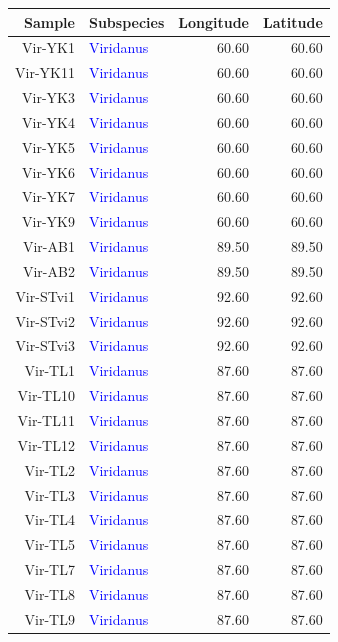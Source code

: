\documentclass[12pt]{article}
\begin{document}
\begin{table}
\centering
\tiny
\begin{tabular}{rlrr}
  \hline
Sample & Subspecies & Longitude & Latitude \\ 
  \hline
 Vir-YK1 & \textcolor{blue}{Viridanus} & 60.60 & 60.60 \\ 
   Vir-YK11 & \textcolor{blue}{Viridanus} & 60.60 & 60.60 \\ 
   Vir-YK3 & \textcolor{blue}{Viridanus} & 60.60 & 60.60 \\ 
   Vir-YK4 & \textcolor{blue}{Viridanus} & 60.60 & 60.60 \\ 
   Vir-YK5 & \textcolor{blue}{Viridanus} & 60.60 & 60.60 \\ 
   Vir-YK6 & \textcolor{blue}{Viridanus} & 60.60 & 60.60 \\ 
   Vir-YK7 & \textcolor{blue}{Viridanus} & 60.60 & 60.60 \\ 
   Vir-YK9 & \textcolor{blue}{Viridanus} & 60.60 & 60.60 \\ 
   Vir-AB1 & \textcolor{blue}{Viridanus} & 89.50 & 89.50 \\ 
   Vir-AB2 & \textcolor{blue}{Viridanus} & 89.50 & 89.50 \\ 
  Vir-STvi1 & \textcolor{blue}{Viridanus} & 92.60 & 92.60 \\ 
  Vir-STvi2 & \textcolor{blue}{Viridanus} & 92.60 & 92.60 \\ 
  Vir-STvi3 & \textcolor{blue}{Viridanus} & 92.60 & 92.60 \\ 
   Vir-TL1 & \textcolor{blue}{Viridanus} & 87.60 & 87.60 \\ 
   Vir-TL10 & \textcolor{blue}{Viridanus} & 87.60 & 87.60 \\ 
   Vir-TL11 & \textcolor{blue}{Viridanus} & 87.60 & 87.60 \\ 
   Vir-TL12 & \textcolor{blue}{Viridanus} & 87.60 & 87.60 \\ 
   Vir-TL2 & \textcolor{blue}{Viridanus} & 87.60 & 87.60 \\ 
   Vir-TL3 & \textcolor{blue}{Viridanus} & 87.60 & 87.60 \\ 
   Vir-TL4 & \textcolor{blue}{Viridanus} & 87.60 & 87.60 \\ 
   Vir-TL5 & \textcolor{blue}{Viridanus} & 87.60 & 87.60 \\ 
   Vir-TL7 & \textcolor{blue}{Viridanus} & 87.60 & 87.60 \\ 
   Vir-TL8 & \textcolor{blue}{Viridanus} & 87.60 & 87.60 \\ 
   Vir-TL9 & \textcolor{blue}{Viridanus} & 87.60 & 87.60 \\ 

\end{tabular}
\end{table}
\end{document}
